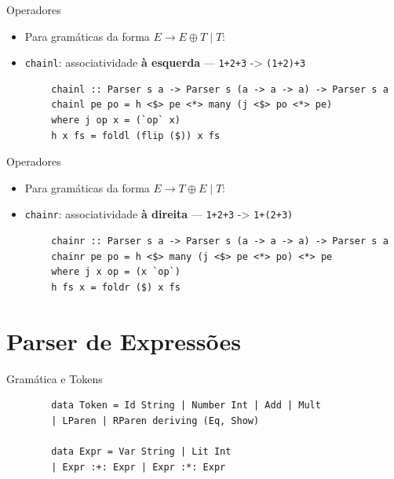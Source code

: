 \begin{frame}[fragile]{Operadores}

    \begin{itemize}
        \item
        Para gramáticas da forma \(E \to E \oplus T \mid T\):
        \item
        \texttt{chainl}: associatividade \textbf{à esquerda}
        --- \texttt{1+2+3} ->
        \texttt{(1+2)+3}
    \end{itemize}

    \begin{lstlisting}
        chainl :: Parser s a -> Parser s (a -> a -> a) -> Parser s a
        chainl pe po = h <$> pe <*> many (j <$> po <*> pe)
        where j op x = (`op` x)
        h x fs = foldl (flip ($)) x fs
    \end{lstlisting}
\end{frame}

\begin{frame}[fragile]{Operadores}

    \begin{itemize}
        \item
        Para gramáticas da forma \(E \to T \oplus E \mid T\):
        \item
        \texttt{chainr}: associatividade \textbf{à direita}
        --- \texttt{1+2+3} ->
        \texttt{1+(2+3)}
    \end{itemize}

    \begin{lstlisting}
        chainr :: Parser s a -> Parser s (a -> a -> a) -> Parser s a
        chainr pe po = h <$> many (j <$> pe <*> po) <*> pe
        where j x op = (x `op`)
        h fs x = foldr ($) x fs
    \end{lstlisting}
\end{frame}


\section{Parser de Expressões}\label{parser-de-expressuxf5es}

\begin{frame}[fragile]{Gramática e Tokens}

    \begin{lstlisting}
        data Token = Id String | Number Int | Add | Mult
        | LParen | RParen deriving (Eq, Show)

        data Expr = Var String | Lit Int
        | Expr :+: Expr | Expr :*: Expr
    \end{lstlisting}
\end{frame}

